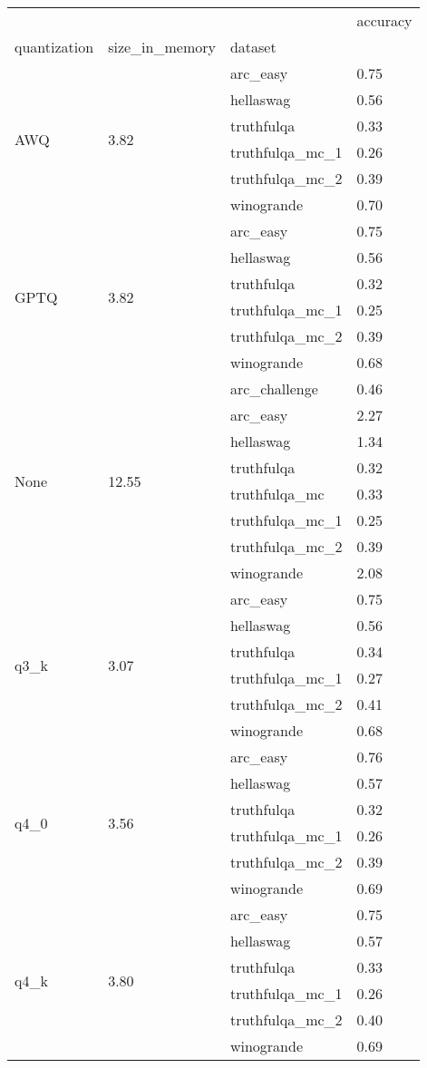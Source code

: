 \begin{tabular}{llll}
\toprule
 &  &  & accuracy \\
quantization & size\_in\_memory & dataset &  \\
\midrule
\multirow[t]{6}{*}{AWQ} & \multirow[t]{6}{*}{3.82} & arc\_easy & 0.75 \\
 &  & hellaswag & 0.56 \\
 &  & truthfulqa & 0.33 \\
 &  & truthfulqa\_mc\_1 & 0.26 \\
 &  & truthfulqa\_mc\_2 & 0.39 \\
 &  & winogrande & 0.70 \\
\cline{1-4} \cline{2-4}
\multirow[t]{6}{*}{GPTQ} & \multirow[t]{6}{*}{3.82} & arc\_easy & 0.75 \\
 &  & hellaswag & 0.56 \\
 &  & truthfulqa & 0.32 \\
 &  & truthfulqa\_mc\_1 & 0.25 \\
 &  & truthfulqa\_mc\_2 & 0.39 \\
 &  & winogrande & 0.68 \\
\cline{1-4} \cline{2-4}
\multirow[t]{8}{*}{None} & \multirow[t]{8}{*}{12.55} & arc\_challenge & 0.46 \\
 &  & arc\_easy & 2.27 \\
 &  & hellaswag & 1.34 \\
 &  & truthfulqa & 0.32 \\
 &  & truthfulqa\_mc & 0.33 \\
 &  & truthfulqa\_mc\_1 & 0.25 \\
 &  & truthfulqa\_mc\_2 & 0.39 \\
 &  & winogrande & 2.08 \\
\cline{1-4} \cline{2-4}
\multirow[t]{6}{*}{q3\_k} & \multirow[t]{6}{*}{3.07} & arc\_easy & 0.75 \\
 &  & hellaswag & 0.56 \\
 &  & truthfulqa & 0.34 \\
 &  & truthfulqa\_mc\_1 & 0.27 \\
 &  & truthfulqa\_mc\_2 & 0.41 \\
 &  & winogrande & 0.68 \\
\cline{1-4} \cline{2-4}
\multirow[t]{6}{*}{q4\_0} & \multirow[t]{6}{*}{3.56} & arc\_easy & 0.76 \\
 &  & hellaswag & 0.57 \\
 &  & truthfulqa & 0.32 \\
 &  & truthfulqa\_mc\_1 & 0.26 \\
 &  & truthfulqa\_mc\_2 & 0.39 \\
 &  & winogrande & 0.69 \\
\cline{1-4} \cline{2-4}
\multirow[t]{6}{*}{q4\_k} & \multirow[t]{6}{*}{3.80} & arc\_easy & 0.75 \\
 &  & hellaswag & 0.57 \\
 &  & truthfulqa & 0.33 \\
 &  & truthfulqa\_mc\_1 & 0.26 \\
 &  & truthfulqa\_mc\_2 & 0.40 \\
 &  & winogrande & 0.69 \\
\cline{1-4} \cline{2-4}
\bottomrule
\end{tabular}
